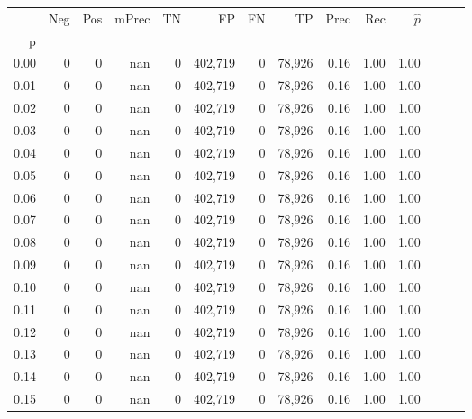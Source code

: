 \begin{tabular}{rrrrrrrrrrrrrr}
\toprule
{} &     Neg &     Pos & mPrec &       TN &       FP &      FN &      TP &  Prec &   Rec & $\hat{p}$ \\
p    &         &         &       &          &          &         &         &       &       &           \\
\midrule
0.00 &       0 &       0 &   nan &        0 &  402,719 &       0 &  78,926 &  0.16 &  1.00 &      1.00 \\
0.01 &       0 &       0 &   nan &        0 &  402,719 &       0 &  78,926 &  0.16 &  1.00 &      1.00 \\
0.02 &       0 &       0 &   nan &        0 &  402,719 &       0 &  78,926 &  0.16 &  1.00 &      1.00 \\
0.03 &       0 &       0 &   nan &        0 &  402,719 &       0 &  78,926 &  0.16 &  1.00 &      1.00 \\
0.04 &       0 &       0 &   nan &        0 &  402,719 &       0 &  78,926 &  0.16 &  1.00 &      1.00 \\
0.05 &       0 &       0 &   nan &        0 &  402,719 &       0 &  78,926 &  0.16 &  1.00 &      1.00 \\
0.06 &       0 &       0 &   nan &        0 &  402,719 &       0 &  78,926 &  0.16 &  1.00 &      1.00 \\
0.07 &       0 &       0 &   nan &        0 &  402,719 &       0 &  78,926 &  0.16 &  1.00 &      1.00 \\
0.08 &       0 &       0 &   nan &        0 &  402,719 &       0 &  78,926 &  0.16 &  1.00 &      1.00 \\
0.09 &       0 &       0 &   nan &        0 &  402,719 &       0 &  78,926 &  0.16 &  1.00 &      1.00 \\
0.10 &       0 &       0 &   nan &        0 &  402,719 &       0 &  78,926 &  0.16 &  1.00 &      1.00 \\
0.11 &       0 &       0 &   nan &        0 &  402,719 &       0 &  78,926 &  0.16 &  1.00 &      1.00 \\
0.12 &       0 &       0 &   nan &        0 &  402,719 &       0 &  78,926 &  0.16 &  1.00 &      1.00 \\
0.13 &       0 &       0 &   nan &        0 &  402,719 &       0 &  78,926 &  0.16 &  1.00 &      1.00 \\
0.14 &       0 &       0 &   nan &        0 &  402,719 &       0 &  78,926 &  0.16 &  1.00 &      1.00 \\
0.15 &       0 &       0 &   nan &        0 &  402,719 &       0 &  78,926 &  0.16 &  1.00 &      1.00 \\

\end{tabular}

